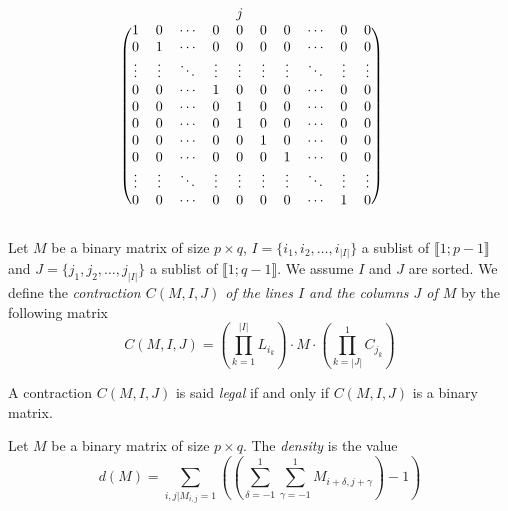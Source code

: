 \begin{definition}
$$\begin{blockarray}{ccccccccccc}
 & & & & j & & & & &\\
\begin{block}{(cccccccccc)c}
1      &  0     & \cdots & 0      & 0 & 0 &  0  & \cdots & 0 & 0 &\\
0      &  1     & \cdots & 0      & 0 & 0 &  0  & \cdots & 0 & 0 &\\
\vdots & \vdots & \ddots & \vdots & \vdots & \vdots &  \vdots  & \ddots & \vdots  & \vdots  &\\
0      &   0    &\cdots  & 1      & 0 & 0 &  0  & \cdots & 0 & 0 &\\ 
0      &   0    &\cdots  & 0      & 1 & 0 &  0  & \cdots & 0 & 0 &\\ 
0      &   0    &\cdots  & 0      & 1 & 0 &  0  & \cdots & 0 & 0 &\\
0      &   0    &\cdots  & 0      & 0 & 1 &  0  & \cdots & 0 & 0 &\\ 
0      &   0    &\cdots  & 0      & 0 & 0  &  1 & \cdots & 0 & 0 &\\
\vdots      &   \vdots    &\ddots  & \vdots     & \vdots & \vdots & \vdots & \ddots & \vdots & \vdots  &\\
0      &   0    &\cdots  & 0      & 0 & 0      &   0    &\cdots  & 1      & 0 &\\
\end{block}
\end{blockarray}
$$
\end{definition}

\begin{definition}
Let $M$ be a binary matrix of size $p \times q$, $I = \{i_1, i_2, \dots, i_{|I|}\}$ a sublist of $\llbracket 1;p-1 \rrbracket$ and $J = \{j_1, j_2, \dots, j_{|I|}\}$ a sublist of $\llbracket 1;q-1 \rrbracket$. We assume $I$ and $J$ are sorted. We define the \emph{contraction $C(M,I,J)$ of the lines $I$ and the columns $J$ of $M$} by the following matrix
$$
C(M,I,J) = \left(\prod\limits_{k = 1}^{|I|} L_{i_k}\right) \cdot M \cdot \left(\prod\limits_{k = |J|}^{1} C_{j_k}\right)
$$
\end{definition}

\begin{definition}
	A contraction $C(M,I,J)$ is said \emph{legal} if and only if $C(M,I,J)$ is a binary matrix.
\end{definition}

\begin{definition}
	Let $M$ be a binary matrix of size $p \times q$. The \emph{density} is the value
	$$ 
	d(M) = \sum\limits_{i,j | M_{i,j} = 1} \left(\left(\sum\limits_{\delta = -1}^1 \sum\limits_{\gamma = -1}^1  M_{i+\delta,j+\gamma}\right) - 1 \right)
	$$
\end{definition}

